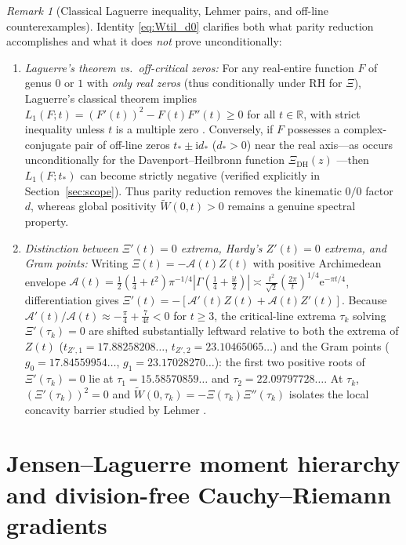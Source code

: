\documentclass[11pt,a4paper,reqno]{amsart}
\theoremstyle{definition}
\theoremstyle{remark}
\newtheorem{remark}[theorem]{Remark}
\numberwithin{equation}{section}
\newcommand{\ii}{\mathrm{i}}
\newcommand{\ee}{\mathrm{e}}
\newcommand{\Wtil}{\widetilde{W}}
\begin{document}
\begin{remark}[Classical Laguerre inequality, Lehmer pairs, and off-line counterexamples]\label{rem:connections}
Identity \eqref{eq:Wtil_d0} clarifies both what parity reduction accomplishes and what it does \emph{not} prove unconditionally:
\begin{enumerate}
\item[\textup{(a)}] \emph{Laguerre's theorem vs.\ off-critical zeros:} For any real-entire function $F$ of genus $0$ or $1$ with \emph{only real zeros} (thus conditionally under RH for $\Xi$), Laguerre's classical theorem implies $L_1(F;t) = (F'(t))^2 - F(t)F''(t) \ge 0$ for all $t \in \mathbb{R}$, with strict inequality unless $t$ is a multiple zero \cite{Jensen1913,Polya1927,Csordas1986}. Conversely, if $F$ possesses a complex-conjugate pair of off-line zeros $t_* \pm \ii d_*$ ($d_* > 0$) near the real axis---as occurs unconditionally for the Davenport--Heilbronn function $\Xi_{\mathrm{DH}}(z)$ \cite{DavenportHeilbronn1936}---then $L_1(F; t_*)$ can become strictly negative (verified explicitly in Section~\ref{sec:scope}). Thus parity reduction removes the kinematic $0/0$ factor $d$, whereas global positivity $\Wtil(0,t) > 0$ remains a genuine spectral property.
\item[\textup{(b)}] \emph{Distinction between $\Xi'(t) = 0$ extrema, Hardy's $Z'(t) = 0$ extrema, and Gram points:} Writing $\Xi(t) = -\mathcal{A}(t) Z(t)$ with positive Archimedean envelope $\mathcal{A}(t) = \frac{1}{2}(\frac{1}{4}+t^2)\pi^{-1/4}|\Gamma(\frac{1}{4}+\frac{\ii t}{2})| \asymp \frac{t^2}{\sqrt{2}}(\frac{2\pi}{t})^{1/4}\ee^{-\pi t/4}$, differentiation gives $\Xi'(t) = -[\mathcal{A}'(t)Z(t) + \mathcal{A}(t)Z'(t)]$. Because $\mathcal{A}'(t)/\mathcal{A}(t) \approx -\frac{\pi}{4} + \frac{7}{4t} < 0$ for $t \ge 3$, the critical-line extrema $\tau_k$ solving $\Xi'(\tau_k) = 0$ are shifted substantially leftward relative to both the extrema of $Z(t)$ ($t_{Z',1} = 17.88258208\dots$, $t_{Z',2} = 23.10465065\dots$) and the Gram points ($g_0 = 17.84559954\dots$, $g_1 = 23.17028270\dots$): the first two positive roots of $\Xi'(\tau_k) = 0$ lie at $\tau_1 = 15.58570859\dots$ and $\tau_2 = 22.09797728\dots$. At $\tau_k$, $(\Xi'(\tau_k))^2 = 0$ and $\Wtil(0,\tau_k) = -\Xi(\tau_k)\Xi''(\tau_k)$ isolates the local concavity barrier studied by Lehmer \cite{Lehmer1956}.
\end{enumerate}
\end{remark}

\section{Jensen--Laguerre moment hierarchy and division-free Cauchy--Riemann gradients}\label{sec:dipole}
\end{document}

